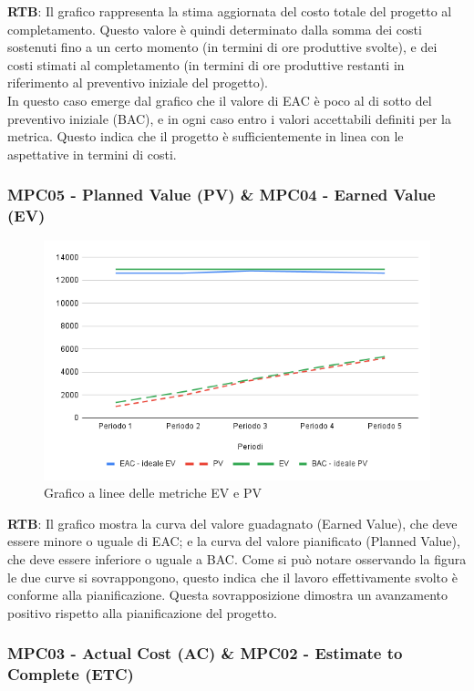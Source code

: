 \documentclass[10pt]{article}
\begin{document}
\begin{justify}
\textbf{RTB}: Il grafico rappresenta la stima aggiornata del costo totale del progetto al completamento. Questo valore è quindi determinato dalla somma 
dei costi sostenuti fino a un certo momento (in termini di ore produttive svolte), e dei costi stimati al completamento (in termini di ore produttive 
restanti in riferimento al preventivo iniziale del progetto).\\ 
In questo caso emerge dal grafico che il valore di EAC è poco al di sotto del preventivo iniziale (BAC), e in ogni caso entro i valori accettabili definiti
per la metrica. Questo indica che il progetto è sufficientemente in linea con le aspettative in termini di costi.


\subsubsection{MPC05 - Planned Value (PV) \& MPC04 - Earned Value (EV)}

\begin{figure}[H]
  \centering
  \includegraphics[width=0.9\linewidth]{EV-PV.png}
  \caption{Grafico a linee delle metriche EV e PV}
  \label{fig:EV-PVchart}
\end{figure}

\textbf{RTB}: Il grafico mostra la curva del valore guadagnato (Earned Value), che deve essere minore o uguale di EAC; e la curva del valore pianificato (Planned Value), 
che deve essere inferiore o uguale a BAC. Come si può notare osservando la figura le due curve si sovrappongono, questo indica che il lavoro effettivamente svolto è 
conforme alla pianificazione. Questa sovrapposizione dimostra un avanzamento positivo rispetto alla pianificazione del progetto.


\subsubsection{MPC03 - Actual Cost (AC) \& MPC02 - Estimate to Complete (ETC)}


\end{justify}
\end{document}
